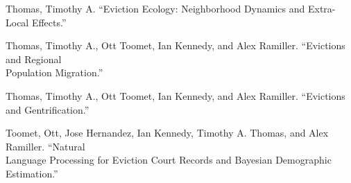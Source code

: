 

\begin{cventries}

  \cventry
    { } %
{ } %
    { } %
    { } %
    {
      \begin{cvitems} %
Thomas, Timothy A. ``Eviction Ecology: Neighborhood Dynamics and Extra-Local Effects.''\\
      \end{cvitems}    
      }
  \cventry
    { } %
{ } %
    { } %
    { } %
    {
      \begin{cvitems} %
Thomas, Timothy A., Ott Toomet, Ian Kennedy, and Alex Ramiller. ``Evictions and Regional\\
    \hspace*{.25in}Population Migration.''\\
      \end{cvitems}    
      }
  \cventry
    { } %
{ } %
    { } %
    { } %
    {
      \begin{cvitems} %
Thomas, Timothy A., Ott Toomet, Ian Kennedy, and Alex Ramiller. ``Evictions and Gentrification.''\\
      \end{cvitems}    
      }
  \cventry
    { } %
{ } %
    { } %
    { } %
    {
      \begin{cvitems} %
Toomet, Ott, Jose Hernandez, Ian Kennedy, Timothy A. Thomas, and Alex Ramiller. ``Natural\\
    \hspace*{.25in}Language Processing for Eviction Court Records and Bayesian Demographic Estimation.''\\

\end{cvitems}}
\end{cventries}
